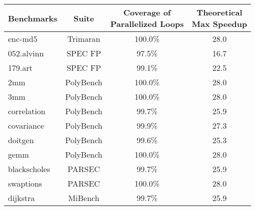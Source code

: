 \small
\centering
\begin{tabular}{|l|c|c|c|}
\hline
Benchmarks & Suite & \makecell{Coverage of \\Parallelized Loops} & \makecell{Theoretical \\Max Speedup} \\ %
\hline
enc-md5    & Trimaran & 100.0\% & 28.0  \\ %
\hline
052.alvinn & SPEC FP  & 97.5\%  & 16.7 \\ %
\hline
179.art    & SPEC FP  & 99.1\%  & 22.5 \\ %
\hline
2mm        & PolyBench & 100.0\% & 28.0 \\ %
\hline
3mm        & PolyBench & 100.0\% & 28.0 \\ %
\hline
correlation & PolyBench & 99.7\% & 25.9 \\ %
\hline
covariance & PolyBench & 99.9\%  & 27.3 \\ %
\hline
doitgen   & PolyBench & 99.6\%  & 25.3  \\ %
\hline
gemm     & PolyBench  & 100.0\% & 28.0 \\ %
\hline
blackscholes & PARSEC & 99.7\% & 25.9 \\ %
\hline
swaptions & PARSEC & 100.0\% & 28.0 \\ %
\hline
dijkstra & MiBench  & 99.7\%  & 25.9 \\ %
\hline
\end{tabular}